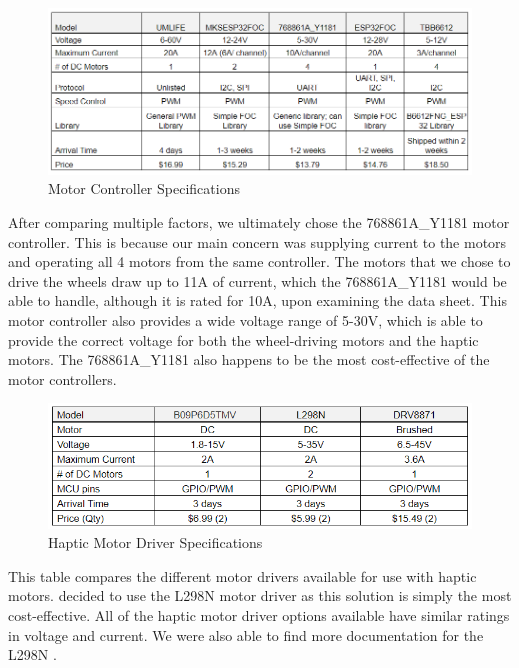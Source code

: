 \begin{figure}[H]
	\centering
	\includegraphics[width=1\textwidth]{./Images/motor_controller_table2.png}
	\caption{\label{fig:motor_controller}Motor Controller Specifications}
\end{figure}

\noindent After comparing multiple factors, we ultimately chose the 768861A\_Y1181 motor controller. This is because our main concern was supplying current to the motors and operating all 4 motors from the same controller. The motors that we chose to drive the wheels draw up to 11A of current, which the 768861A\_Y1181 would be able to handle, although it is rated for 10A, upon examining the data sheet. This motor controller also provides a wide voltage range of 5-30V, which is able to provide the correct voltage for both the wheel-driving motors and the haptic motors. The 768861A\_Y1181 also happens to be the most cost-effective of the motor controllers. \cite{UMLIFE} \cite{AliExpress5} \cite{Makerbase} \cite{AliExpress7} \cite{CircuitBasics} \cite{Espressif1} \cite{AliExpress4} \cite{Burgess} \cite{RandomNerd} \cite{Espressif2} \cite{SimpleFOC} \cite{SimpleFOC2} \cite{Peza}\\


\begin{figure}[H]
	\centering
	\includegraphics[width=1\textwidth]{./Images/haptic_driver_table_2.png}
	\caption{\label{fig:haptic_driver}Haptic Motor Driver Specifications}
\end{figure}

\noindent This table compares the different motor drivers available for use with haptic motors.  decided to use the L298N motor driver as this solution is simply the most cost-effective. All of the haptic motor driver options available have similar ratings in voltage and current. We were also able to find more documentation for the L298N \cite{BOJACK} \cite{BEEYDC} \cite{HiLetgo}.\\

